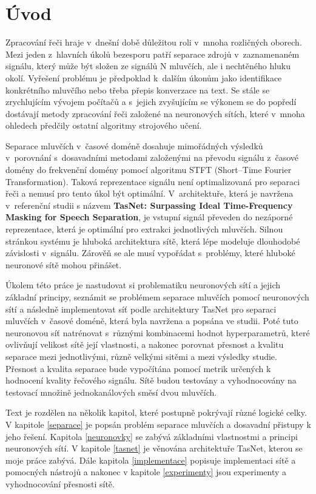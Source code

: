 \chapter{Úvod}
Zpracování řeči hraje v~dnešní době důležitou roli v~mnoha rozličných oborech. Mezi jeden z~hlavních úkolů bezesporu patří separace zdrojů v~zaznamenaném signálu, který může být složen ze signálů N mluvčích, ale i nechtěného hluku okolí. Vyřešení problému je předpoklad k~dalším úkonům jako identifikace konkrétního mluvčího nebo třeba přepis konverzace na text. Se stále se zrychlujícím vývojem počítačů a s~jejich zvyšujícím se výkonem se do popředí dostávají metody zpracování řeči založené na neuronových sítích, které v~mnoha ohledech předčily ostatní algoritmy strojového učení.

Separace mluvčích v~časové doméně dosahuje mimořádných výsledků v~porovnání s~dosavadními metodami  založenými na převodu signálu z~časové domény do frekvenční domény pomocí algoritmu STFT (Short--Time Fourier Transformation). Taková reprezentace signálu není optimalizovaná pro separaci řeči a nemusí pro tento úkol být optimální. V~architektuře, která je navržena v~referenční studii s názvem \textbf{TasNet: Surpassing Ideal Time-Frequency Masking for Speech Separation}\cite{luo2018convtasnet}, je vstupní signál převeden do nezáporné reprezentace, která je optimální pro extrakci jednotlivých mluvčích. Silnou stránkou systému je hluboká architektura sítě, která lépe modeluje dlouhodobé závislosti v~signálu. Zárověň se ale musí vypořádat s~problémy, které hluboké neuronové sítě mohou přinášet.

Úkolem této práce je nastudovat si problematiku neuronových sítí a jejich základní principy, seznámit se problémem separace mluvčích pomocí neuronových sítí a následně implementovat síť podle architektury TasNet pro separaci mluvčích v~časové doméně, která byla navržena a popsána ve studii\cite{luo2018convtasnet}. Poté tuto neuronovou síť natrénovat s~různými kombinacemi hodnot hyperparametrů, které ovlivňují velikost sítě  její vlastnosti, a nakonec porovnat přesnost a kvalitu separace mezi jednotlivými, různě velkými sitěmi a mezi výsledky studie. Přesnost a kvalita separace bude vypočítána pomocí metrik určených k hodnocení kvality řečového signálu. Sítě budou testovány a vyhodnocovány na testovací množině jednokanálových směsí dvou mluvčích.

Text je rozdělen na několik kapitol, které postupně pokrývají různé logické celky. V kapitole \ref{separace} je popsán problém separace mluvčích a dosavadní přistupy k jeho řešení. Kapitola \ref{neuronovky} se zabývá základními vlastnostmi a principi neuronových sítí. V kapitole \ref{tasnet} je věnována architektuře TasNet, kterou se moje práce zabývá. Dále kapitola \ref{implementace} popisuje implementaci sítě a pomocných nástrojů a nakonec v kapitole \ref{experimenty} jsou experimenty a vyhodnocování přesnosti sítě.


